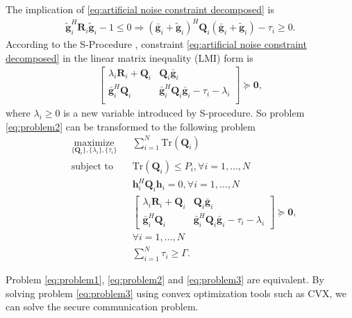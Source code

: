 \documentclass[12pt, journal,onecolumn,draftclsnofoot]{IEEEtran}
\begin{document}
The implication of \eqref{eq:artificial noise constraint decomposed} is
\begin{eqnarray}
\tilde{\mathbf{g}}_i^H\mathbf{R}_i\tilde{\mathbf{g}} _i - 1\leq 0  \Rightarrow (\bar{\mathbf{g}}_i+\tilde{\mathbf{g}}_i)^H\mathbf{Q}_i(\bar{\mathbf{g}}_i+\tilde{\mathbf{g}}_i) - \tau_i \geq 0.
\end{eqnarray}
According to the S-Procedure \cite{ConvexOpt_Boyd}, constraint \eqref{eq:artificial noise constraint decomposed}  in the linear matrix inequality (LMI) form is
\begin{eqnarray}
\left[ {\begin{array}{cc}
	\lambda_i\mathbf{R}_i+\mathbf{Q}_i  & \mathbf{Q}_i\bar{\mathbf{g}}_i \\
	\bar{\mathbf{g}}_i^H\mathbf{Q}_i& \bar{\mathbf{g}}_i^H\mathbf{Q}_i\bar{\mathbf{g}} _i- \tau_i -\lambda_i\\
	\end{array} } \right] \succeq \mathbf{0},
\end{eqnarray}
where $\lambda_i \geq 0$ is a new variable introduced by S-procedure. So problem \eqref{eq:problem2} can be transformed to the following problem
\begin{equation}
\begin{aligned} \label{eq:problem3}
& \underset{\{\mathbf{Q}_i\},\{\lambda_i\},\{\tau_i\}}{\text{maximize}}
& & \sum_{i = 1}^{N}\mathrm{Tr}(\mathbf{Q}_i) \\
& \text{subject to}
& & \mathrm{Tr}(\mathbf{Q}_i) \leq P_i, \forall i = 1, \ldots, N\\
&&& \mathbf{h}_i^H \mathbf{Q}_i \mathbf{h}_i= 0, \forall i = 1,\ldots,N\\
&&& \left[ {\begin{array}{cc}
	\lambda_i\mathbf{R}_i+\mathbf{Q}_i  & \mathbf{Q}_i\bar{\mathbf{g}}_i \\
	\bar{\mathbf{g}}_i^H\mathbf{Q}_i & \bar{\mathbf{g}}_i^H\mathbf{Q}_i\bar{\mathbf{g}}_i - \tau_i -\lambda_i
	\end{array} } \right] \succeq \mathbf{0},\\
&&& \forall i = 1, \ldots, N\\
&&&\sum_{i =1}^{N}\tau_i \geq \Gamma.
\end{aligned}
\end{equation}

Problem \eqref{eq:problem1}, \eqref{eq:problem2} and \eqref{eq:problem3} are equivalent. By solving problem \eqref{eq:problem3} using convex optimization tools such as CVX\cite{cvx}, we can solve the secure communication problem.
\end{document}
